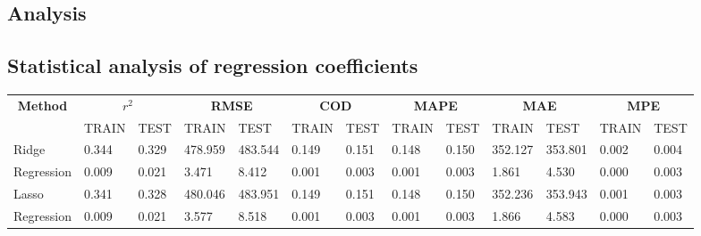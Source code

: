 \documentclass{article}
\begin{document}
\subsection{Analysis}
\newpage
\subsection{Statistical analysis of regression coefficients}



\def\arraystretch{1.8}
\scriptsize{
\begin{longtable}[c]{|p{2.3cm}|ll|ll|ll|ll|ll|ll|}
  \hline
  \multicolumn{1}{|c|}{\multirow{2}{*}{\textbf{Method}}}      & \multicolumn{2}{c|}{$r^2$}            & \multicolumn{2}{c|}{\textbf{RMSE}}              & \multicolumn{2}{c|}{\textbf{COD}}           & \multicolumn{2}{c|}{\textbf{MAPE}}          & \multicolumn{2}{c|}{\textbf{MAE}}               & \multicolumn{2}{c|}{\textbf{MPE}}             \\ \cline{2-13} 
  \multicolumn{1}{|c|}{}                             & \multicolumn{1}{l|}{TRAIN} & TEST  & \multicolumn{1}{l|}{TRAIN}   & TEST    & \multicolumn{1}{l|}{TRAIN} & TEST  & \multicolumn{1}{l|}{TRAIN} & TEST  & \multicolumn{1}{l|}{TRAIN}   & TEST    & \multicolumn{1}{l|}{TRAIN}  & TEST   \\ \hline
  \endhead
  Ridge                 & \multicolumn{1}{l|}{0.344} & 0.329 & \multicolumn{1}{l|}{478.959} & 483.544 & \multicolumn{1}{l|}{0.149} & 0.151 & \multicolumn{1}{l|}{0.148} & 0.150 & \multicolumn{1}{l|}{352.127} & 353.801 & \multicolumn{1}{l|}{0.002}  & 0.004  \\
  Regression& \multicolumn{1}{l|}{0.009} & 0.021 & \multicolumn{1}{l|}{3.471}   & 8.412   & \multicolumn{1}{l|}{0.001} & 0.003 & \multicolumn{1}{l|}{0.001} & 0.003 & \multicolumn{1}{l|}{1.861}   & 4.530   & \multicolumn{1}{l|}{0.000}  & 0.003  \\ \hline
  Lasso                  & \multicolumn{1}{l|}{0.341} & 0.328 & \multicolumn{1}{l|}{480.046} & 483.951 & \multicolumn{1}{l|}{0.149} & 0.151 & \multicolumn{1}{l|}{0.148} & 0.150 & \multicolumn{1}{l|}{352.236} & 353.943 & \multicolumn{1}{l|}{0.001}  & 0.003  \\
  Regression & \multicolumn{1}{l|}{0.009} & 0.021 & \multicolumn{1}{l|}{3.577}   & 8.518   & \multicolumn{1}{l|}{0.001} & 0.003 & \multicolumn{1}{l|}{0.001} & 0.003 & \multicolumn{1}{l|}{1.866}   & 4.583   & \multicolumn{1}{l|}{0.000}  & 0.003  \\ \hline

\end{longtable}}
\end{document}
